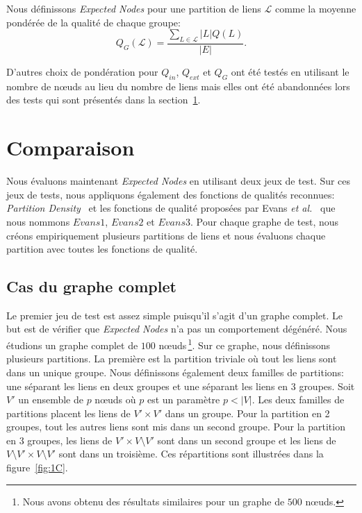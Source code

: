 Nous définissons \emph{Expected Nodes} pour une partition de liens $\mathcal{L}$ comme la moyenne pondérée de la qualité de chaque groupe:
\begin{equation}
\label{eq:qualite_globale} Q_G(\mathcal{L}) = \dfrac{\sum_{L\in \mathcal{L}} |L|Q(L)}{|E|}.
\end{equation}

D'autres choix de pondération pour $Q_{in}$, $Q_{ext}$ et $Q_G$ ont été testés en utilisant le nombre de n\oe uds au lieu du nombre de liens mais elles ont été abandonnées lors des tests qui sont présentés dans la section~\ref{sec:expected_comp}.

\section{Comparaison}
\label{sec:expected_comp}
Nous évaluons maintenant \emph{Expected Nodes} en utilisant deux jeux de test.
Sur ces jeux de tests, nous appliquons également des fonctions de qualités reconnues:
\emph{Partition Density}~\cite{Ahn2010a} et les fonctions de qualité proposées par Evans \emph{et al.}~\cite{Evans2009} que nous nommons $Evans1$, $Evans2$ et $Evans3$.
Pour chaque graphe de test, nous créons empiriquement plusieurs partitions de liens et nous évaluons chaque partition avec toutes les fonctions de qualité.

\subsection{Cas du graphe complet}
\label{Completegraph}
Le premier jeu de test est assez simple puisqu'il s'agit d'un graphe complet.
Le but est de vérifier que \emph{Expected Nodes} n'a pas un comportement dégénéré.
Nous étudions un graphe complet de $100$ n\oe uds\,\footnote{Nous avons obtenu des résultats similaires pour un graphe de $500$ n\oe uds.}.
Sur ce graphe, nous définissons plusieurs partitions.
La première est la partition triviale où tout les liens sont dans un unique groupe.
Nous définissons également deux familles de partitions: une séparant les liens en deux groupes et une séparant les liens en 3 groupes.
Soit $V'$ un ensemble de $p$ n\oe uds où $p$ est un paramètre $p<|V|$.
Les deux familles de partitions placent les liens de $V' \times V'$ dans un groupe.
Pour la partition en 2 groupes, tout les autres liens sont mis dans un second groupe.
Pour la partition en 3 groupes, les liens de $V' \times V\setminus V'$ sont dans un second groupe et les liens de $V \setminus V' \times V\setminus V'$ sont dans un troisième.
Ces répartitions sont illustrées dans la figure~\ref{fig:1C}.


